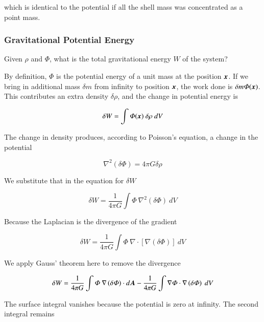 which is identical to the potential if all the shell mass was concentrated as a point mass.


\subsubsection{Gravitational Potential Energy}

Given $\rho$ and $\varPhi$, what is the total gravitational energy $W$ of the system?

By definition, $\varPhi$ is the potential energy of a unit mass at the position ${\boldsymbol{x}}$. If we bring in additional mass $\delta m$ from infinity to position ${\boldsymbol{x}}$, the work done is $\delta m \varPhi({\boldsymbol{x}})$. This contributes an extra density $\delta \rho$, and the change in potential energy is 

\begin{equation}
\delta W =  \int \varPhi({\boldsymbol{x}}) \ \delta \rho \ dV
\end{equation}

The change in density produces, according to Poisson's equation, a change in the potential 

\begin{equation}
\nabla^2 \left(\delta \varPhi\right)  =  4\pi G \delta \rho 
\end{equation}


We substitute that in the equation for $\delta W$ 


\begin{equation}
\delta W =  \frac{1}{4\pi G}\int \varPhi \ \nabla^2 \left(\delta \varPhi\right) \ dV
\end{equation}

Because the Laplacian is the divergence of the gradient 


\begin{equation}
\delta W =  \frac{1}{4\pi G}\int \varPhi \ \nabla \cdot \left[ \nabla \left( \delta \varPhi\right)\right] \ dV
\end{equation}

We apply Gauss' theorem here to remove the divergence 

\begin{equation}
\delta W =  \frac{1}{4\pi G}\int \varPhi \ \nabla \left( \delta \varPhi\right) \cdot d\v{A} - \frac{1}{4\pi G}\int \nabla \varPhi \cdot \nabla \left( \delta \varPhi\right) \ dV
\end{equation}

The surface integral vanishes because the potential is zero at infinity. The second integral remains 


